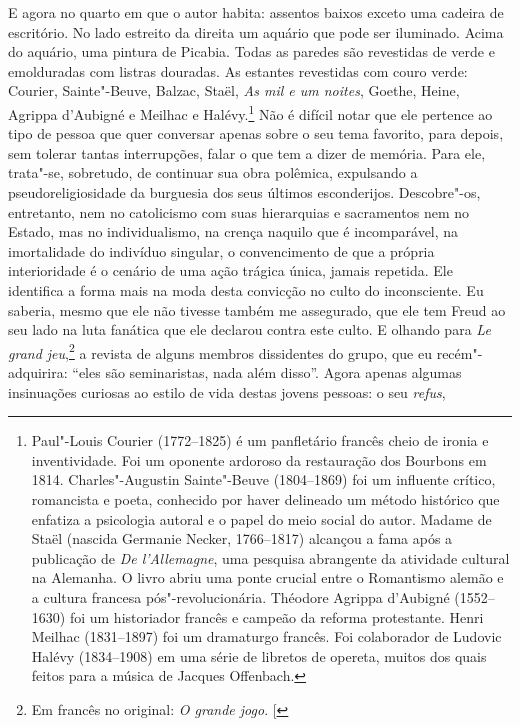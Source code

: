 E agora no quarto em que o autor habita: assentos baixos exceto uma
cadeira de escritório. No lado estreito da direita um aquário que pode
ser iluminado. Acima do aquário, uma pintura de Picabia. Todas as paredes
são revestidas de verde e emolduradas com listras douradas. As estantes
revestidas com couro verde: Courier, Sainte"-Beuve, Balzac, Staël,
\emph{As mil e um noites}, Goethe, Heine, Agrippa d'Aubigné e Meilhac e
Halévy.\footnote{Paul"-Louis Courier (1772--1825) é um panfletário
  francês cheio de ironia e inventividade. Foi um oponente ardoroso da
  restauração dos Bourbons em 1814. Charles"-Augustin Sainte"-Beuve
  (1804--1869) foi um influente crítico, romancista e poeta, conhecido
  por haver delineado um método histórico que enfatiza a psicologia
  autoral e o papel do meio social do autor. Madame de Staël (nascida
  Germanie Necker, 1766--1817) alcançou a fama após a publicação de
  \emph{De l'Allemagne}, uma pesquisa abrangente da atividade cultural
  na Alemanha. O livro abriu uma ponte crucial entre o Romantismo alemão
  e a cultura francesa pós"-revolucionária. Théodore Agrippa d'Aubigné
  (1552--1630) foi um historiador francês e campeão da reforma
  protestante. Henri Meilhac (1831--1897) foi um dramaturgo francês. Foi
  colaborador de Ludovic Halévy (1834--1908) em uma série de libretos de
  opereta, muitos dos quais feitos para a música de Jacques Offenbach. \versal{[N.~O.]}}
Não é difícil notar que ele pertence ao tipo de pessoa que quer conversar apenas sobre o seu tema favorito, para depois, sem tolerar tantas interrupções, falar o que tem a dizer de memória. Para
ele, trata"-se, sobretudo, de continuar sua obra polêmica, expulsando a
pseudoreligiosidade da burguesia dos seus últimos esconderijos.
Descobre"-os, entretanto, nem no catolicismo com suas hierarquias e
sacramentos nem no Estado, mas no individualismo, na crença naquilo que
é incomparável, na imortalidade do indivíduo singular, o convencimento
de que a própria interioridade é o cenário de uma ação trágica única,
jamais repetida. Ele identifica a forma mais na moda desta convicção no
culto do inconsciente. Eu saberia, mesmo que ele não tivesse também me assegurado, que ele tem Freud ao seu lado na luta fanática que ele declarou contra este culto. E olhando para \emph{Le grand jeu},\footnote{Em francês no original: \emph{O grande jogo}. {[}\versal{N.~T.}{]}} a revista de
alguns membros dissidentes do grupo, que eu recém"-adquirira: ``eles são
seminaristas, nada além disso''. Agora apenas algumas insinuações
curiosas ao estilo de vida destas jovens pessoas: o seu \emph{refus},
